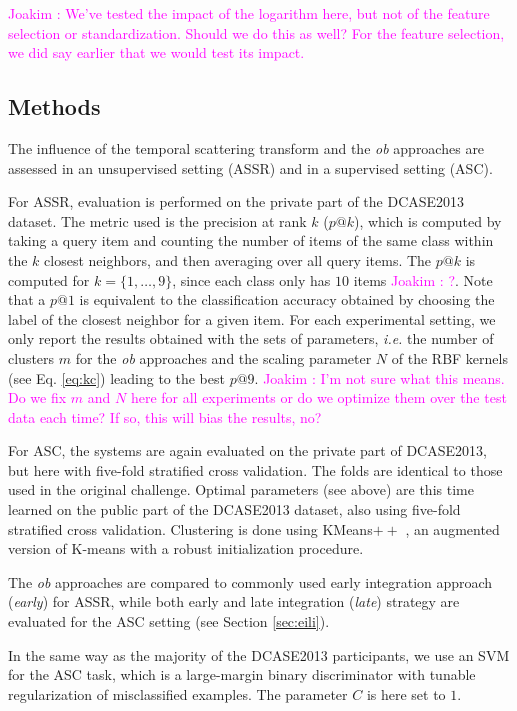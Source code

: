 \documentclass[journal]{IEEEtran}
\newcommand{\ja}[1]{\textcolor{magenta}{Joakim : #1}}
\begin{document}
\ja{We've tested the impact of the logarithm here, but not of the feature selection or standardization. Should we do this as well? For the feature selection, we did say earlier that we would test its impact.}

\subsection{Methods}

The influence of the temporal scattering transform and the \emph{ob} approaches are assessed in an unsupervised setting (ASSR) and in a supervised setting (ASC).

For ASSR, evaluation is performed on the private part of the DCASE2013 dataset. The metric used is the precision at rank $k$ ($p@k$), which is computed by taking a query item and counting the number of items of the same class within the $k$ closest neighbors, and then averaging over all query items. The $p@k$ is computed for $k=\{1,\ldots,9\}$, since each class only has $10$ items \ja{?}. Note that a $p@1$ is equivalent to the classification accuracy obtained by choosing the label of the closest neighbor for a given item. For each experimental setting, we only report the results obtained with the sets of parameters, \emph{i.e.} the number of clusters $m$ for the \emph{ob} approaches and the scaling parameter $N$ of the RBF kernels (see Eq. \ref{eq:kc}) leading to the best $p@9$. \ja{I'm not sure what this means. Do we fix $m$ and $N$ here for all experiments or do we optimize them over the test data each time? If so, this will bias the results, no?}
 
For ASC, the systems are again evaluated on the private part of DCASE2013, but here with five-fold stratified cross validation. The folds are identical to those used in the original challenge. Optimal parameters (see above) are this time learned on the public part of the DCASE2013 dataset, also using five-fold stratified cross validation. Clustering is done using KMeans$++$ \cite{arthur2007k}, an augmented version of K-means with a robust initialization procedure.

The \emph{ob} approaches are compared to commonly used early integration approach (\emph{early}) for ASSR, while both early and late integration (\emph{late}) strategy are evaluated for the ASC setting (see Section \ref{sec:eili}).

In the same way as the majority of the DCASE2013 participants, we use an SVM for the ASC task, which is a large-margin binary discriminator with tunable regularization of misclassified examples. The parameter $C$ is here set to $1$.
\end{document}
